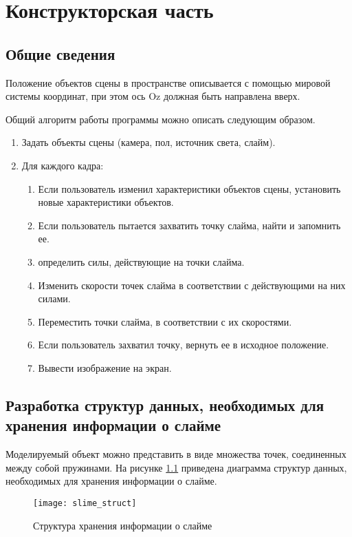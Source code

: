 \chapter{Конструкторская часть}

\section{Общие сведения}

Положение объектов сцены в пространстве описывается с помощью
мировой системы координат, при этом ось Oz должная быть направлена вверх.

Общий алгоритм работы программы можно описать следующим образом.

\begin{enumerate}
	\item Задать объекты сцены (камера, пол, источник света, слайм).
	\item Для каждого кадра:
	\begin{enumerate}
		\item Если пользователь изменил характеристики объектов сцены, установить новые характеристики объектов.
		\item Если пользователь пытается захватить точку слайма, найти и запомнить ее.
		\item определить силы, действующие на точки слайма.
		\item Изменить скорости точек слайма в соответствии с действующими на них силами.
		\item Переместить точки слайма, в соответствии с их скоростями.
		\item Если пользователь захватил точку, вернуть ее в исходное положение.
		\item Вывести изображение на экран.
	\end{enumerate}
\end{enumerate}

\section{Разработка структур данных, необходимых для хранения информации о слайме}

Моделируемый объект можно представить в виде множества точек, соединенных между собой пружинами. На рисунке \ref{slime_struct} приведена диаграмма структур данных, необходимых для хранения информации о слайме.

\begin{figure}[H]
	\centering
	\texttt{[image: slime\_struct]}
	\caption{Структура хранения информации о слайме}
	\label{slime_struct}
\end{figure}

